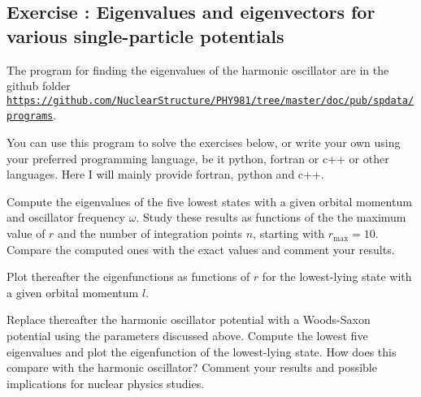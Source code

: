 \documentclass[graybox,sectrefs,envcountresetchap,open=right]{svmonodo}
\newenvironment{doconceexercise}{}{}
\newcounter{doconceexercisecounter}
\begin{document}
\begin{doconceexercise}

\subsection*{Exercise \thedoconceexercisecounter: Eigenvalues and eigenvectors for various single-particle potentials}


The program for finding the eigenvalues of the harmonic oscillator are in the github folder
\href{{https://github.com/NuclearStructure/PHY981/tree/master/doc/pub/spdata/programs}}{\nolinkurl{https://github.com/NuclearStructure/PHY981/tree/master/doc/pub/spdata/programs}}.

You can use this program to solve the exercises below, or write your own using your preferred programming language, be it python, fortran or c++ or other languages. Here I will mainly provide fortran, python and c++.


Compute the eigenvalues of the five lowest states with a given orbital momentum and oscillator frequency $\omega$. Study these results as functions of the the maximum value of $r$ and the number of integration points $n$, starting with  $r_{\mathrm{max}}=10$. Compare the computed ones with the exact values and comment your results.

Plot thereafter the eigenfunctions as functions of $r$ for the lowest-lying state with a given orbital momentum $l$.

Replace thereafter the harmonic oscillator potential with a Woods-Saxon potential using the parameters discussed above. Compute the lowest five eigenvalues and plot the eigenfunction of the lowest-lying state. How does this compare with the harmonic oscillator? Comment your results and possible implications for nuclear physics studies.

\end{doconceexercise}
\end{document}
